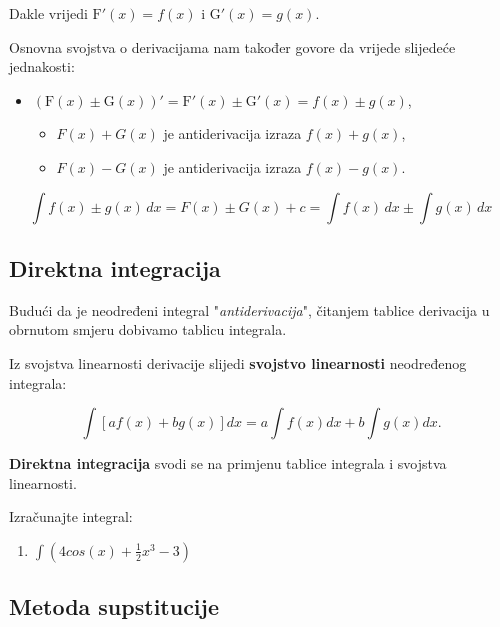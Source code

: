 Dakle vrijedi $\mathrm{F}'\left( x \right) = f\left( x \right)$ i $\mathrm{G}'\left( x \right) =
g\left( x \right)$.

Osnovna svojstva o derivacijama nam također govore da vrijede slijedeće jednakosti:
\begin{itemize}
    \item $\left( \mathrm{F}\left( x \right) \pm \mathrm{G}\left( x
    \right) \right)' =
    \mathrm{F}'\left( x \right) \pm \mathrm{G}'\left( x \right) =
    f\left( x \right) \pm g\left( x \right)$,
    \begin{itemize}
        \item $F\left( x \right) + G\left( x \right)$ je antiderivacija izraza
        $f\left( x \right) + g\left( x \right)$,
        \item $F\left( x \right) - G\left( x
        \right)$ je antiderivacija izraza $f\left( x \right) - g\left( x \right)$.
    \end{itemize}
\end{itemize}

$$
\int{{f\left( x \right) \pm g\left( x \right)\,dx}} = F\left( x
\right) \pm G\left( x \right) + c = \int{{f\left( x \right)\,dx}} \pm
\int{{g\left( x \right)\,dx}}
$$


\subsection{Direktna integracija}

Budući da je neodređeni integral "\textit{antiderivacija}", čitanjem tablice
derivacija u obrnutom smjeru dobivamo tablicu integrala.

Iz svojstva linearnosti derivacije slijedi \textbf{svojstvo linearnosti}
neodređenog integrala:

$$
\int \left[af(x) + bg(x)\right] dx = a \int f(x) dx + b \int g(x) dx.
$$

\textbf{Direktna integracija} svodi se na primjenu tablice integrala i svojstva
linearnosti.

\begin{example}
    Izračunajte integral:

    \begin{enumerate}
        \item $\displaystyle \int \left(4 cos(x) + \frac{1}{2} x^3 - 3\right)$
    \end{enumerate}
\end{example}

\subsection{Metoda supstitucije}

